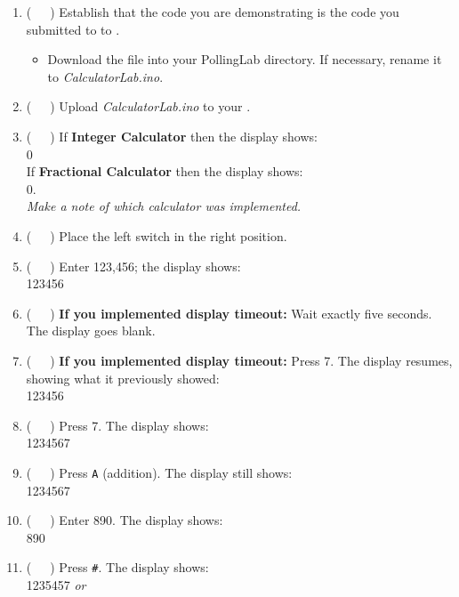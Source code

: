 \begin{enumerate}
\item (\ \ \ ) Establish that the code you are demonstrating is the code you
    submitted to to \filesubmission.
    \begin{itemize}
    \item Download the file into your PollingLab directory. If necessary,
        rename it to \textit{CalculatorLab.ino}.
    \end{itemize}
\item (\ \ \ ) Upload \textit{CalculatorLab.ino} to your \nano.
\item (\ \ \ ) If \textbf{Integer Calculator} then the display shows: \\
    {\dviiseg \phantom{8888888}0} \\
    If \textbf{Fractional Calculator} then the display shows: \\
        {\dviiseg \phantom{8888888}0.} \\
    \textit{Make a note of which calculator was implemented.}
\item (\ \ \ ) Place the left switch in the right position.
\item (\ \ \ ) Enter 123,456; the display shows: \\
    {\dviiseg \phantom{88}123456}
\item (\ \ \ ) \textbf{If you implemented display timeout:} Wait exactly five
    seconds. The display goes blank.
\item (\ \ \ ) \textbf{If you implemented display timeout:} Press 7. The display
    resumes, showing what it previously showed: \\
    {\dviiseg \phantom{88}123456}
\item (\ \ \ ) Press 7. The display shows: \\
    {\dviiseg \phantom{8}1234567}
\item (\ \ \ ) Press \texttt{A} (addition). The display still shows: \\
    {\dviiseg \phantom{8}1234567}
\item (\ \ \ ) Enter 890. The display shows: \\
    {\dviiseg \phantom{88888}890}
\item (\ \ \ ) Press \texttt{\#}. The display shows: \\
    {\dviiseg \phantom{8}1235457} \hspace{1cm} \textit{or} \hspace{1cm}

\end{enumerate}
